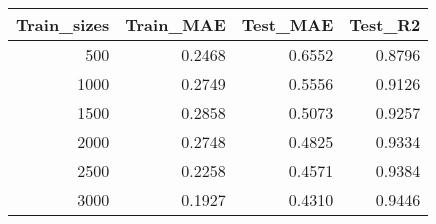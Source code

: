 \begin{tabular}{rrrr}
\toprule
Train_sizes & Train_MAE & Test_MAE & Test_R2 \\
\midrule
500 & 0.2468 & 0.6552 & 0.8796 \\
1000 & 0.2749 & 0.5556 & 0.9126 \\
1500 & 0.2858 & 0.5073 & 0.9257 \\
2000 & 0.2748 & 0.4825 & 0.9334 \\
2500 & 0.2258 & 0.4571 & 0.9384 \\
3000 & 0.1927 & 0.4310 & 0.9446 \\
\bottomrule
\end{tabular}
